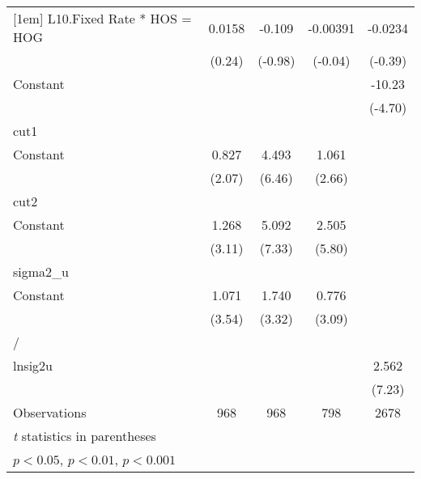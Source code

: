 {\begin{longtable}{l*{4}{c}}
[1em]
L10.Fixed Rate * HOS = HOG&   0.0158         &   -0.109         & -0.00391         &  -0.0234         \\
                &   (0.24)         &  (-0.98)         &  (-0.04)         &  (-0.39)         \\
[1em]
Constant        &                  &                  &                  &   -10.23\sym{***}\\
                &                  &                  &                  &  (-4.70)         \\
\hline
cut1            &                  &                  &                  &                  \\
Constant        &    0.827\sym{*}  &    4.493\sym{***}&    1.061\sym{**} &                  \\
                &   (2.07)         &   (6.46)         &   (2.66)         &                  \\
\hline
cut2            &                  &                  &                  &                  \\
Constant        &    1.268\sym{**} &    5.092\sym{***}&    2.505\sym{***}&                  \\
                &   (3.11)         &   (7.33)         &   (5.80)         &                  \\
\hline
sigma2\_u        &                  &                  &                  &                  \\
Constant        &    1.071\sym{***}&    1.740\sym{***}&    0.776\sym{**} &                  \\
                &   (3.54)         &   (3.32)         &   (3.09)         &                  \\
\hline
/               &                  &                  &                  &                  \\
lnsig2u         &                  &                  &                  &    2.562\sym{***}\\
                &                  &                  &                  &   (7.23)         \\
\hline
Observations    &      968         &      968         &      798         &     2678         \\
\hline\hline
\multicolumn{5}{l}{\footnotesize \textit{t} statistics in parentheses}\\
\multicolumn{5}{l}{\footnotesize \sym{*} \(p<0.05\), \sym{**} \(p<0.01\), \sym{***} \(p<0.001\)}\\
\end{longtable}
}
